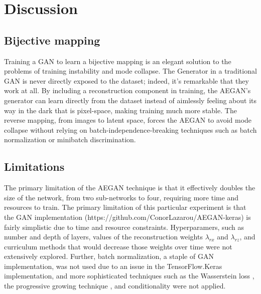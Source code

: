 \documentclass{article}
\begin{document}
\section{Discussion}
\subsection{Bijective mapping}
Training a GAN to learn a bijective mapping is an elegant solution to the problems of training instability and mode collapse. The Generator in a traditional GAN is never directly exposed to the dataset; indeed, it's remarkable that they work at all. By including a reconstruction component in training, the AEGAN's generator can learn directly from the dataset instead of aimlessly feeling about its way in the dark that is pixel-space, making training much more stable. The reverse mapping, from images to latent space, forces the AEGAN to avoid mode collapse without relying on batch-independence-breaking techniques such as batch normalization or minibatch discrimination.

\subsection{Limitations}
The primary limitation of the AEGAN technique is that it effectively doubles the size of the network, from two sub-networks to four, requiring more time and resources to train. The primary limitation of this particular experiment is that the GAN implementation (https://github.com/ConorLazarou/AEGAN-keras) is fairly simplistic due to time and resource constraints. Hyperparamers, such as number and depth of layers, values of the reconstruction weights $\lambda_{rx}$ and $\lambda_{rz}$, and curriculum methods that would decrease those weights over time were not extensively explored. Further, batch normalization, a staple of GAN implementation, was not used due to an issue in the TensorFlow.Keras implementation, and more sophisticated techniques such as the Wasserstein loss \cite{arjovsky2017wasserstein}, the progressive growing technique \cite{karras2017progressive}, and conditionality \cite{mirza2014conditional} were not applied.
\end{document}

